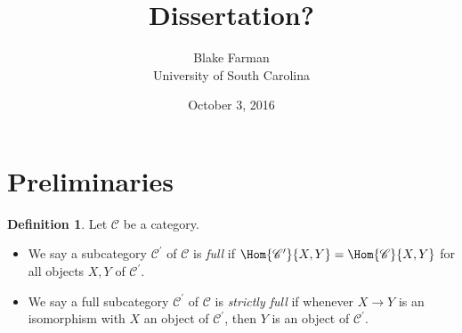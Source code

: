 \documentclass[10pt]{amsart}
\author{Blake Farman\\University of South Carolina}
\title{Dissertation?}
\date{October 3, 2016}
\begin{document}

\providecommand{\p}{\mathfrak{p}}
\providecommand{\m}{\mathfrak{m}}
\providecommand{\Deck}[1]{\operatorname{Deck}\left(#1\right)}
\newtheorem{thm}{Theorem}
\newtheorem{ex}{}
\newtheorem{lem}{Lemma}
\newtheorem{cor}{Corollary}
\newtheorem{prop}{Proposition}
\theoremstyle{definition}
\newtheorem{defn}{Definition}
\newtheorem{rmk}{Remark}

\newcommand{\A}{\mathbb{A}}
\newcommand{\T}{\mathscr{T}}
\newcommand{\CC}{\mathscr{C}}
\newcommand{\D}{\mathscr{D}}
\section{Preliminaries}
\begin{defn}
  Let $\mathscr{C}$ be a category.
  \begin{itemize}
  \item
    We say a subcategory $\mathscr{C^\prime}$ of $\mathscr{C}$ is {\it full} if 
    $\Hom{\mathscr{C^\prime}}{X,Y} = \Hom{\mathscr{C}}{X,Y}$
    for all objects $X,Y$ of $\mathscr{C^\prime}$.
  \item
    We say a full subcategory $\mathscr{C^\prime}$ of $\mathscr{C}$ is {\it strictly full} if whenever $X \rightarrow Y$ is an isomorphism with $X$ an object of $\mathscr{C^\prime}$, then $Y$ is an object of $\mathscr{C^\prime}$.
  \end{itemize}
\end{defn}
\end{document}
